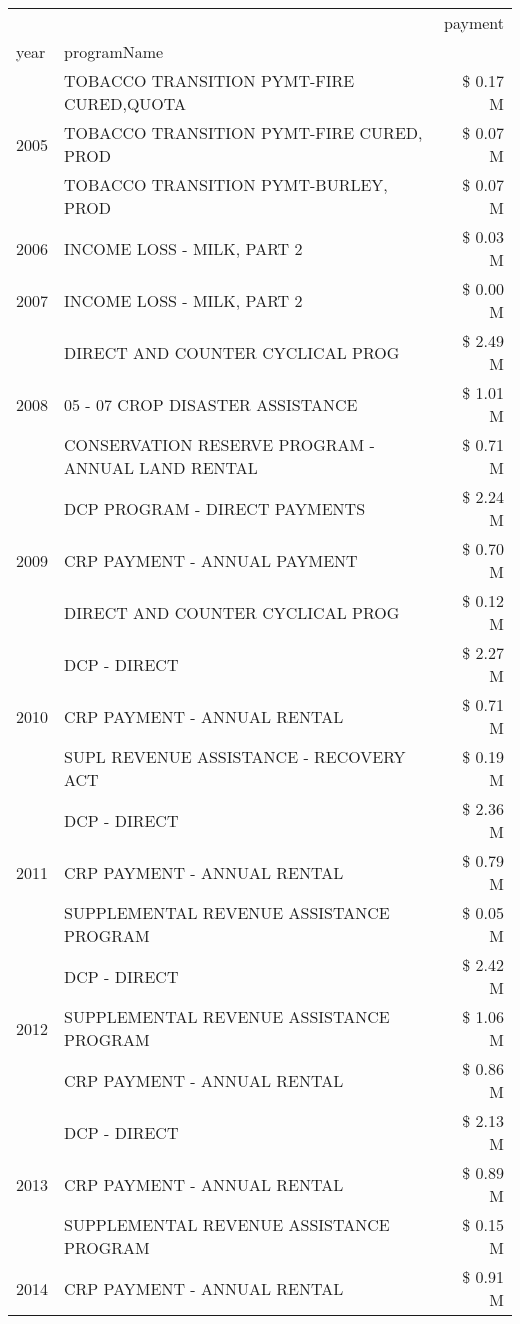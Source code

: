\begin{tabular}{llr}
\toprule
 &  & payment \\
year & programName &  \\
\midrule
\multirow[t]{3}{*}{2005} & TOBACCO TRANSITION PYMT-FIRE CURED,QUOTA & \$ 0.17 M \\
 & TOBACCO TRANSITION PYMT-FIRE CURED, PROD & \$ 0.07 M \\
 & TOBACCO TRANSITION PYMT-BURLEY, PROD & \$ 0.07 M \\
\cline{1-3}
2006 & INCOME LOSS - MILK, PART 2 & \$ 0.03 M \\
\cline{1-3}
2007 & INCOME LOSS - MILK, PART 2 & \$ 0.00 M \\
\cline{1-3}
\multirow[t]{3}{*}{2008} & DIRECT AND COUNTER CYCLICAL PROG & \$ 2.49 M \\
 & 05 - 07 CROP DISASTER ASSISTANCE & \$ 1.01 M \\
 & CONSERVATION RESERVE PROGRAM - ANNUAL LAND RENTAL & \$ 0.71 M \\
\cline{1-3}
\multirow[t]{3}{*}{2009} & DCP PROGRAM - DIRECT PAYMENTS & \$ 2.24 M \\
 & CRP PAYMENT - ANNUAL PAYMENT & \$ 0.70 M \\
 & DIRECT AND COUNTER CYCLICAL PROG & \$ 0.12 M \\
\cline{1-3}
\multirow[t]{3}{*}{2010} & DCP - DIRECT & \$ 2.27 M \\
 & CRP PAYMENT - ANNUAL RENTAL & \$ 0.71 M \\
 & SUPL REVENUE ASSISTANCE - RECOVERY ACT & \$ 0.19 M \\
\cline{1-3}
\multirow[t]{3}{*}{2011} & DCP - DIRECT & \$ 2.36 M \\
 & CRP PAYMENT - ANNUAL RENTAL & \$ 0.79 M \\
 & SUPPLEMENTAL REVENUE ASSISTANCE PROGRAM & \$ 0.05 M \\
\cline{1-3}
\multirow[t]{3}{*}{2012} & DCP - DIRECT & \$ 2.42 M \\
 & SUPPLEMENTAL REVENUE ASSISTANCE PROGRAM & \$ 1.06 M \\
 & CRP PAYMENT - ANNUAL RENTAL & \$ 0.86 M \\
\cline{1-3}
\multirow[t]{3}{*}{2013} & DCP - DIRECT & \$ 2.13 M \\
 & CRP PAYMENT - ANNUAL RENTAL & \$ 0.89 M \\
 & SUPPLEMENTAL REVENUE ASSISTANCE PROGRAM & \$ 0.15 M \\
\cline{1-3}
\multirow[t]{3}{*}{2014} & CRP PAYMENT - ANNUAL RENTAL & \$ 0.91 M \\

\end{tabular}
